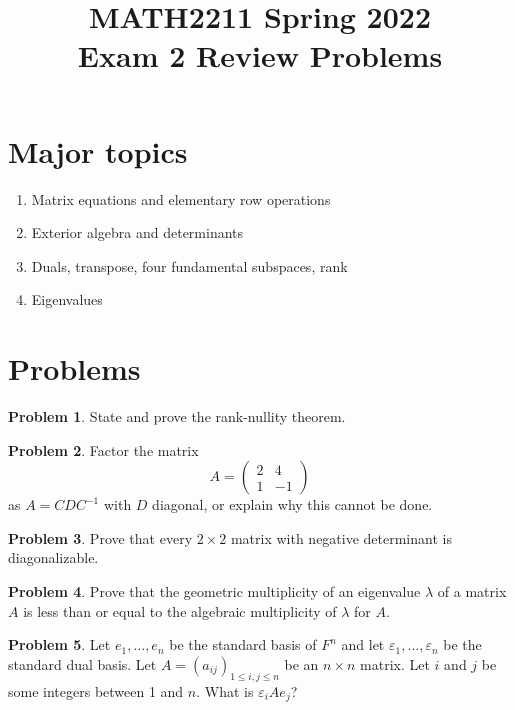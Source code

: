 \documentclass[11pt,oneside]{amsart}
\title{MATH2211 Spring 2022\\
Exam 2 Review Problems}
\author{}
\theoremstyle{definition}
\newtheorem{problem}{Problem}
\newcommand{\eps}{\varepsilon}
\begin{document}
    \maketitle

    \section{Major topics}
    \begin{enumerate}
        \item Matrix equations and elementary row operations
        \item Exterior algebra and determinants
        \item Duals, transpose, four fundamental subspaces, rank
        \item Eigenvalues
    \end{enumerate}

    \section{Problems}
    \begin{problem}
        State and prove the rank-nullity theorem.
    \end{problem}

    \begin{problem}
        Factor the matrix
        \[A=\begin{pmatrix}
            2&4\\1&-1
        \end{pmatrix}\]
        as $A=CDC^{-1}$ with $D$ diagonal, or explain why this cannot be done.
    \end{problem}

    \begin{problem}
        Prove that every $2\times 2$ matrix with negative determinant is diagonalizable.
    \end{problem}

    \begin{problem}
        Prove that the geometric multiplicity of an eigenvalue $\lambda$ of a matrix $A$ is less than or equal to the algebraic multiplicity of $\lambda$ for $A$.
    \end{problem}

    \begin{problem}
        Let $e_1,\dots,e_n$ be the standard basis of $F^n$ and let $\eps_1,\dots,\eps_n$ be the standard dual basis. Let $A=(a_{ij})_{1\leq i,j\leq n}$ be an $n\times n$ matrix. Let $i$ and $j$ be some integers between 1 and $n$. What is $\eps_iAe_j$?
    \end{problem}
\end{document}
